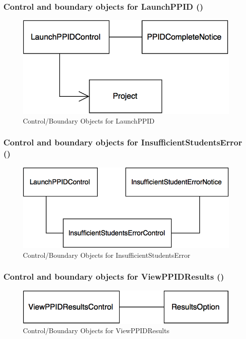 \documentclass[12pt,letterpaper]{article}
\begin{document}
\subsubsection*{Control and boundary objects for LaunchPPID (\launchppid{})}

\begin{figure}[H]
	\centering{}
	\includegraphics[scale=0.4]{imgs/cbod/launch-ppid.png}
	\caption{Control/Boundary Objects for LaunchPPID}
\end{figure}

\subsubsection*{Control and boundary objects for InsufficientStudentsError (\insufficientstudentserror{})}

\begin{figure}[H]
	\centering{}
	\includegraphics[scale=0.4]{imgs/cbod/insufficient-students-error.png}
	\caption{Control/Boundary Objects for InsufficientStudentsError}
\end{figure}

\subsubsection*{Control and boundary objects for ViewPPIDResults (\viewppidresults{})}

\begin{figure}[H]
	\centering{}
	\includegraphics[scale=0.4]{imgs/cbod/view-ppid-results.png}
	\caption{Control/Boundary Objects for ViewPPIDResults}
\end{figure}
\end{document}
